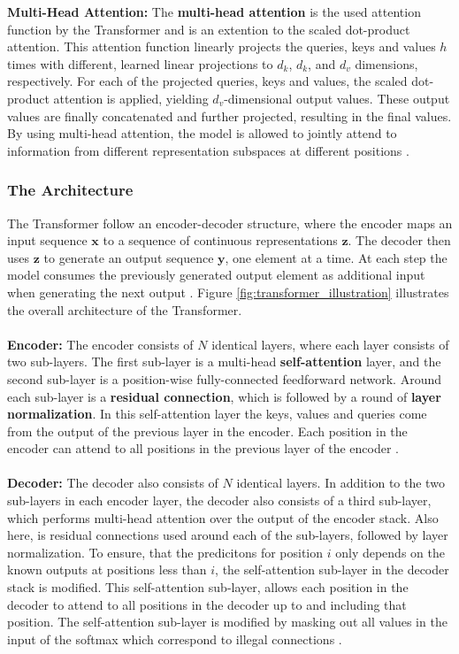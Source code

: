 \documentclass[./main.tex]{subfiles}
\begin{document}
\textbf{Multi-Head Attention:} The \textbf{multi-head attention} is the used attention function by the Transformer and is an extention to the scaled dot-product attention. This attention function linearly projects the queries, keys and values $h$ times with different, learned linear projections to $d_k$, $d_k$, and $d_v$ dimensions, respectively. For each of the projected queries, keys and values, the scaled dot-product attention is applied, yielding $d_v$-dimensional output values. These output values are finally concatenated and further projected, resulting in the final values. By using multi-head attention, the model is allowed to jointly attend to information from different representation subspaces at different positions \cite{https://doi.org/10.48550/arxiv.1706.03762}.

\subsubsection{The Architecture}
The Transformer follow an encoder-decoder structure, where the encoder maps an input sequence $\bm{x}$ to a sequence of continuous representations $\bm{z}$. The decoder then uses $\bm{z}$ to generate an output sequence $\bm{y}$, one element at a time. At each step the model consumes the previously generated output element as additional input when generating the next output \cite{https://doi.org/10.48550/arxiv.1706.03762}. Figure \ref{fig:transformer_illustration} illustrates the overall architecture of the Transformer.
\\
\\
\noindent \textbf{Encoder:} The encoder consists of $N$ identical layers, where each layer consists of two sub-layers. The first sub-layer is a multi-head \textbf{self-attention} layer, and the second sub-layer is a position-wise fully-connected feedforward network. Around each sub-layer is a \textbf{residual connection}, which is followed by a round of \textbf{layer normalization}. In this self-attention layer the keys, values and queries come from the output of the previous layer in the encoder. Each position in the encoder can attend to all positions in the previous layer of the encoder \cite{https://doi.org/10.48550/arxiv.1706.03762}.
\\
\\
\noindent \textbf{Decoder:} The decoder also consists of $N$ identical layers. In addition to the two sub-layers in each encoder layer, the decoder also consists of a third sub-layer, which performs multi-head attention over the output of the encoder stack. Also here, is residual connections used around each of the sub-layers, followed by layer normalization. To ensure, that the predicitons for position $i$ only depends on the known outputs at positions less than $i$, the self-attention sub-layer in the decoder stack is modified. This self-attention sub-layer, allows each position in the decoder to attend to all positions in the decoder up to and including that position. The self-attention sub-layer is modified by masking out all values in the input of the softmax which correspond to illegal connections \cite{https://doi.org/10.48550/arxiv.1706.03762}.
\end{document}
